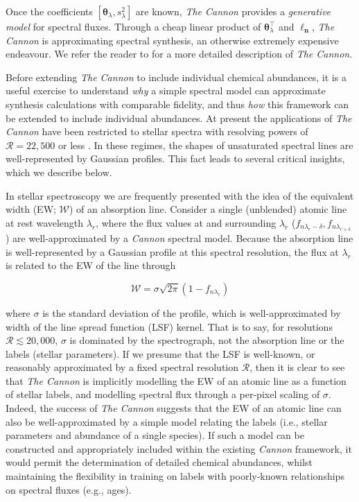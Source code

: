 \documentclass[useAMS,usenatbib]{mn2e}
\newcommand\tc{\textit{The Cannon}}
\newcommand\lv{\mathbf{\boldsymbol\ell_n}}
\newcommand\cv{{\boldsymbol\theta}_\lambda}
\newcommand\ssq{s_\lambda^2}
\begin{document}
Once the coefficients $[\cv,\ssq]$ are known, \tc{} provides a \textit{generative model} for spectral fluxes. Through a cheap linear product of $\cv^\intercal$ and $\lv$, \tc{} is approximating spectral synthesis, an otherwise extremely expensive endeavour. We refer the reader to \citet{Ness15a} for a more detailed description of \tc{}. 

Before extending \tc{} to include individual chemical abundances, it is
a useful exercise to understand \textit{why} a simple spectral model can 
approximate synthesis calculations with comparable fidelity, and thus \textit{how} this framework can be extended to include individual abundances. At present the applications of \tc{} have been restricted to stellar spectra with resolving powers of $\mathcal{R} = 22,500$ \citep[APOGEE;][]{Ness15a} or less \citep[e.g., LAMOST;][]{Ho15}. In these regimes, the shapes of unsaturated spectral lines are well-represented by Gaussian profiles. This fact leads to several critical insights, which we describe below.

In stellar spectroscopy we are frequently presented with the idea of the equivalent width (EW; $\mathcal{W}$) of an absorption line. Consider a single (unblended) atomic line at rest wavelength $\lambda_r$, where the flux values at and surrounding $\lambda_r$ ($f_{n\lambda_r-{\delta}},f_{n\lambda_{r+\delta}}$) are well-approximated by a \textit{Cannon} spectral model. Because the absorption line is well-represented by a Gaussian profile at this spectral resolution, the flux at $\lambda_r$ is related to the EW of the line through

\begin{equation}
\mathcal{W} = \sigma{}\sqrt{2\pi}(1 - f_{n\lambda_r})
\label{eq:ew-flux}
\end{equation}

where $\sigma$ is the standard deviation of the profile, which is well-approximated by width of the line spread function (LSF) kernel. That is to say, for resolutions $\mathcal{R} \lesssim 20,000$, $\sigma$ is dominated by the spectrograph, not the absorption line or the labels (stellar parameters). If we presume that the LSF is well-known, or reasonably approximated by a fixed spectral resolution $\mathcal{R}$, then it is clear to see that \tc{} is implicitly modelling the EW of an atomic line as a function of stellar labels, and modelling spectral flux through a per-pixel scaling of $\sigma$. Indeed, the success of \tc{} suggests that the EW of an atomic line can also be well-approximated by a simple model relating the labels (i.e., stellar parameters and abundance of a single species). If such a model can be constructed and appropriately included within the existing \textit{Cannon} framework, it would permit the determination of detailed chemical abundances, whilst maintaining the flexibility in training on labels with poorly-known relationships on spectral fluxes (e.g., ages).
\end{document}
